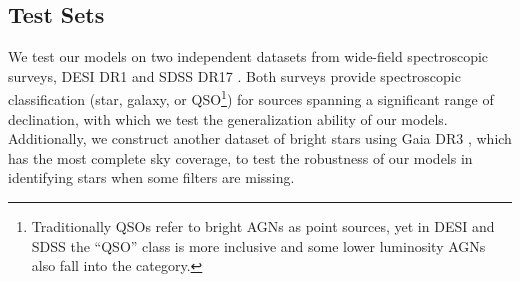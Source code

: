 \documentclass[twocolumn,tighten]{aastex631}
\newcommand{\dr}[1]{DR{#1}}
\begin{document}
\begin{CJK*}{UTF8}{gbsn}
\subsection{Test Sets}
We test our models on two independent datasets from wide-field spectroscopic surveys, DESI \dr{1} \citep{DESI_DR1_2025} and SDSS \dr{17} \citep{SDSS_2022}. Both surveys provide spectroscopic classification (star, galaxy, or QSO\footnote{Traditionally QSOs refer to bright AGNs as point sources, yet in DESI and SDSS the ``QSO'' class is more inclusive and some lower luminosity AGNs also fall into the category.}) for sources spanning a significant range of declination, with which we test the generalization ability of our models. Additionally, we construct another dataset of bright stars using Gaia \dr{3} \citep{GaiaDR3_2023}, which has the most complete sky coverage, to test the robustness of our models in identifying stars when some filters are missing.


\end{CJK*}
\end{document}
